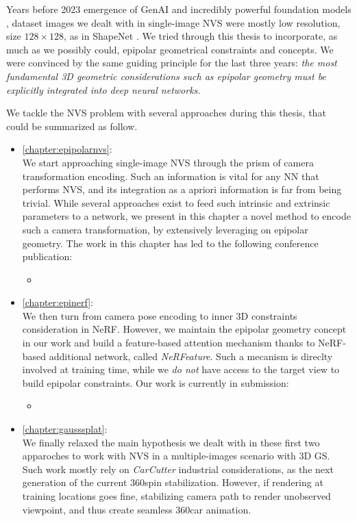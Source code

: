 Years before 2023 emergence of \ac{GenAI} and incredibly powerful foundation models \citep{awais2023foundational}, dataset images we dealt with in single-image \ac{NVS} were mostly low resolution, size $128\times128$, as in ShapeNet \citep{ShapeNet}. We tried through this thesis to incorporate, as much as we possibly could, epipolar geometrical constraints and concepts. We were convinced by the same guiding principle for the last three years: \textit{the most fundamental 3D geometric considerations such as epipolar geometry must be explicitly integrated into deep neural networks.}

We tackle the \ac{NVS} problem with several approaches during this thesis, that could be summarized as follow.
\begin{itemize}
      \item \autoref{chapter:epipolarnvs}: \\
            We start approaching single-image \ac{NVS} through the prism of camera transformation encoding. Such an information is vital for any \ac{NN} that performs \ac{NVS}, and its integration as a apriori information is far from being trivial. While several approaches exist to feed such intrinsic and extrinsic parameters to a network, we present in this chapter a novel method to encode such a camera transformation, by extensively leveraging on epipolar geometry. The work in this chapter has led to the following conference publication:
            \begin{itemize}
                \item {}
            \end{itemize}


      \item \autoref{chapter:epinerf}: \\
            We then turn from camera pose encoding to inner 3D constraints consideration in \ac{NeRF}. However, we maintain the epipolar geometry concept in our work and build a feature-based attention mechanism thanks to \ac{NeRF}-based additional network, called \textit{NeRFeature}. Such a mecanism is direclty involved at training time, while we \textit{do not} have access to the target view to build epipolar constraints. Our work is currently in submission:
            \begin{itemize}
                  \item {}
            \end{itemize}

      \item \autoref{chapter:gausssplat}: \\
            We finally relaxed the main hypothesis we dealt with in these first two apparoches to work with \ac{NVS} in a multiple-images scenario with 3D \ac{GS}. Such work mostly rely on \textit{CarCutter} 
industrial considerations, as the next generation of the current 360\degree spin stabilization. However, if rendering at training locations goes fine, stabilizing camera path to render unobserved viewpoint, and thus create seamless 360\degree car animation. 
\end{itemize}
